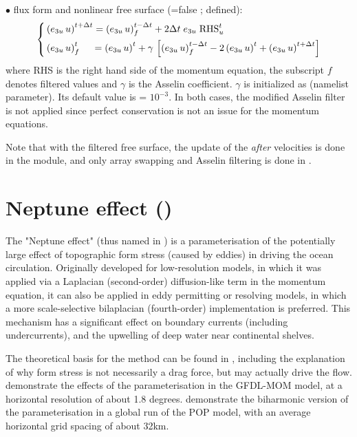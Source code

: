 $\bullet$ flux form and nonlinear free surface (=false ;  defined):
\begin{equation} \label{Eq_dynnxt_flux}
\left\{   \begin{aligned}
&\left(e_{3u}\,u\right)^{t+\Delta t} = \left(e_{3u}\,u\right)_f^{t-\Delta t} + 2\Delta t \; e_{3u} \;\text{RHS}_u^t  	\\
&\left(e_{3u}\,u\right)_f^t \;\quad = \left(e_{3u}\,u\right)^t
  +\gamma \,\left[ {\left(e_{3u}\,u\right)_f^{t-\Delta t} -2\left(e_{3u}\,u\right)^t+\left(e_{3u}\,u\right)^{t+\Delta t}} \right]
\end{aligned}   \right.
\end{equation} 
where RHS is the right hand side of the momentum equation, the subscript $f$ 
denotes filtered values and $\gamma$ is the Asselin coefficient. $\gamma$ is 
initialized as  (namelist parameter). Its default value is  = $10^{-3}$.
In both cases, the modified Asselin filter is not applied since perfect conservation 
is not an issue for the momentum equations.

Note that with the filtered free surface, the update of the \textit{after} velocities 
is done in the  module, and only array swapping
and Asselin filtering is done in .

\section  [Neptune effect (\textit{dynnept})]
                {Neptune effect ()}
\label{DYN_nept}

The "Neptune effect" (thus named in \citep{HollowayOM86}) is a
parameterisation of the potentially large effect of topographic form stress
(caused by eddies) in driving the ocean circulation. Originally developed for
low-resolution models, in which it was applied via a Laplacian (second-order)
diffusion-like term in the momentum equation, it can also be applied in eddy
permitting or resolving models, in which a more scale-selective bilaplacian
(fourth-order) implementation is preferred. This mechanism has a
significant effect on boundary currents (including undercurrents), and the
upwelling of deep water near continental shelves.

The theoretical basis for the method can be found in 
\citep{HollowayJPO92}, including the explanation of why form stress is not
necessarily a drag force, but may actually drive the flow. 
\citep{HollowayJPO94} demonstrate the effects of the parameterisation in
the GFDL-MOM model, at a horizontal resolution of about 1.8 degrees. 
\citep{HollowayOM08} demonstrate the biharmonic version of the
parameterisation in a global run of the POP model, with an average horizontal
grid spacing of about 32km.

